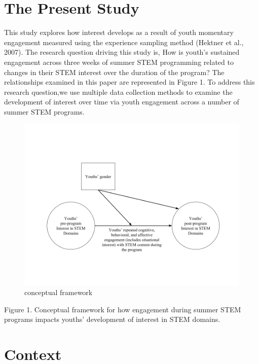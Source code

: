 \documentclass[man]{apa6}
\theoremstyle{definition}
\theoremstyle{definition}
\theoremstyle{definition}
\theoremstyle{remark}
\begin{document}
\section{The Present Study}\label{the-present-study}

This study explores how interest develops as a result of youth momentary
engagement measured using the experience sampling method (Hektner et
al., 2007). The research question driving this study is, How is youth's
sustained engagement across three weeks of summer STEM programming
related to changes in their STEM interest over the duration of the
program? The relationships examined in this paper are represented in
Figure 1. To address this research question,we use multiple data
collection methods to examine the development of interest over time via
youth engagement across a number of summer STEM programs.

\begin{figure}
\centering
\includegraphics{conceptual-framework.png}
\caption{conceptual framework}
\end{figure}

Figure 1. Conceptual framework for how engagement during summer STEM
programs impacts youths' development of interest in STEM domains.

\section{Context}\label{context}
\end{document}

